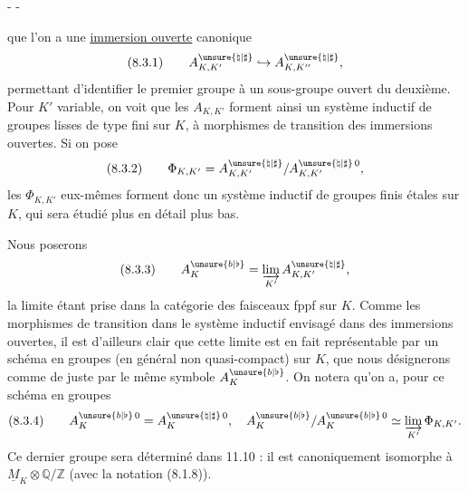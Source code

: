 -  - 

que l'on a une \uline{immersion ouverte} canonique
\[
(8.3.1)\qquad A_{K,K'}^{\unsure{\natural|\sharp}}
 \hookrightarrow A_{K,K''}^{\unsure{\natural|\sharp}},
\]
permettant d'identifier le premier groupe à un sous-groupe ouvert du deuxième.
Pour \(K'\) variable, on voit que les \(A_{K,K'}\) forment ainsi un système inductif
de groupes lisses de type fini sur \(K\), à morphismes de transition des immersions
ouvertes. Si on pose
\[
(8.3.2)\qquad\Phi_{K,K'}=
 A_{K,K'}^{\unsure{\natural|\sharp}}/A_{K,K'}^{\unsure{\natural|\sharp}\,0},
\]
les \(\Phi_{K,K'}\) eux-mêmes forment donc un système inductif de groupes finis
étales sur \(K\), qui sera étudié plus en détail plus bas.

Nous poserons
\[
(8.3.3)\qquad A_K^{\unsure{b|\flat}}=
 \varinjlim_{K'}A_{K,K'}^{\unsure{\natural|\sharp}},
\]
la limite étant prise dans la catégorie des faisceaux fppf sur \(K\). Comme
les morphismes de transition dans le système inductif envisagé dans des immersions
ouvertes, il est d'ailleurs clair que cette limite est en fait représentable
par un schéma en groupes (en général non quasi-compact) sur \(K\), que nous
désignerons comme de juste par le même symbole \(A_K^{\unsure{b|\flat}}\).
On notera qu'on a, pour ce schéma en groupes
\[
(8.3.4)\qquad A_K^{\unsure{b|\flat}\,0}=A_K^{\unsure{\natural|\sharp}\,0},\quad
 A_K^{\unsure{b|\flat}}/A_K^{\unsure{b|\flat}\,0}
 \simeq\varinjlim_{K'}\Phi_{K,K'}.
\]
Ce dernier groupe sera déterminé dans 11.10 : il est canoniquement isomorphe
à \(\underline M_K\otimes\mathbb Q/\mathbb Z\) (avec la notation (8.1.8)).
